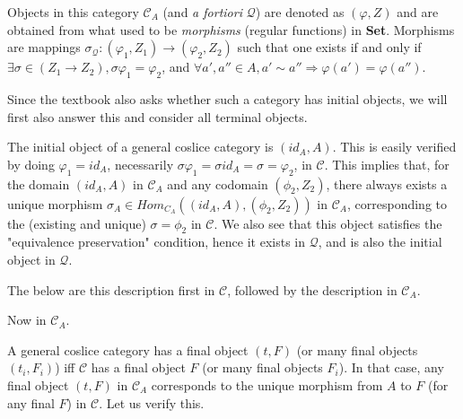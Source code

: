 \documentclass[12pt, letterpaper, twoside]{report}
\begin{document}
Objects in this category $\mathcal{C}_A$ (and \textit{a fortiori} $\mathcal{Q}$) are denoted as $(\varphi, Z)$ and are obtained from what used to be \textit{morphisms} (regular functions) in \textbf{Set}. Morphisms are mappings $\sigma_{\mathcal{Q}} : (\varphi_1, Z_1) \to (\varphi_2, Z_2)$ such that one exists if and only if $\exists \sigma \in (Z_1 \to Z_2), \sigma \varphi_1 = \varphi_2$, and $\forall a', a'' \in A, a' \sim a'' \Rightarrow \varphi(a') = \varphi(a'')$.

Since the textbook also asks whether such a category has initial objects, we will first also answer this and consider all terminal objects.

The initial object of a general coslice category is $(id_A, A)$. This is easily verified by doing $\varphi_1 = id_A$, necessarily $\sigma \varphi_1 = \sigma id_A = \sigma = \varphi_2$, in $\mathcal{C}$. This implies that, for the domain $(id_A, A)$ in $\mathcal{C}_A$ and any codomain $(\phi_2, Z_2)$, there always exists a unique morphism $\sigma_A \in Hom_{C_A}((id_A, A), (\phi_2, Z_2))$ in $\mathcal{C}_A$, corresponding to the (existing and unique) $\sigma = \phi_2$ in $\mathcal{C}$. We also see that this object satisfies the "equivalence preservation" condition, hence it exists in $\mathcal{Q}$, and is also the initial object in $\mathcal{Q}$.

The below are this description first in $\mathcal{C}$, followed by the description in $\mathcal{C}_A$.


Now in $\mathcal{C}_A$.


A general coslice category has a final object $(t, F)$ (or many final objects $(t_i, F_i)$) iff $\mathcal{C}$ has a final object $F$ (or many final objects $F_i$). In that case, any final object $(t, F)$ in $\mathcal{C}_A$ corresponds to the unique morphism from $A$ to $F$ (for any final $F$) in $\mathcal{C}$. Let us verify this.
\end{document}

